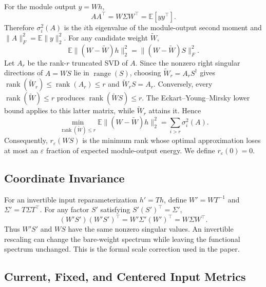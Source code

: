 \documentclass[letterpaper]{article} %
\begin{document}
For the module output $y=Wh$,
\begin{equation}
AA^\top=W\Sigma W^\top=\mathbb E[yy^\top].
\label{eq:supp-output}
\end{equation}
Therefore $\sigma_i^2(A)$ is the $i$th eigenvalue of the module-output second moment and
$\|A\|_F^2=\mathbb E\|y\|_2^2$. For any candidate weight $\widetilde W$,
\begin{equation}
\mathbb E\|(W-\widetilde W)h\|_2^2
=\|(W-\widetilde W)S\|_F^2.
\label{eq:supp-error}
\end{equation}
Let $A_r$ be the rank-$r$ truncated SVD of $A$. Since the nonzero right singular
directions of $A=WS$ lie in $\operatorname{range}(S)$, choosing
$\widetilde W_r=A_rS^\dagger$ gives
$\operatorname{rank}(\widetilde W_r)\leq\operatorname{rank}(A_r)\leq r$ and
$\widetilde W_rS=A_r$. Conversely, every
$\operatorname{rank}(\widetilde W)\leq r$ produces
$\operatorname{rank}(\widetilde WS)\leq r$. The Eckart--Young--Mirsky lower
bound applies to this latter matrix, while $\widetilde W_r$ attains it. Hence
\begin{equation}
\min_{\operatorname{rank}(\widetilde W)\le r}
\mathbb E\|(W-\widetilde W)h\|_2^2
=\sum_{i>r}\sigma_i^2(A).
\label{eq:supp-optimal}
\end{equation}
Consequently, $r_\varepsilon(WS)$ is the minimum rank whose optimal approximation loses
at most an $\varepsilon$ fraction of expected module-output energy. We define
$r_\varepsilon(0)=0$.

\subsection{Coordinate Invariance}

For an invertible input reparameterization $h'=Th$, define
$W'=WT^{-1}$ and $\Sigma'=T\Sigma T^\top$. For any factor $S'$ satisfying
$S'(S')^\top=\Sigma'$,
\begin{equation}
(W'S')(W'S')^\top
=W'\Sigma'(W')^\top
=W\Sigma W^\top.
\end{equation}
Thus $W'S'$ and $WS$ have the same nonzero singular values. An invertible rescaling can
change the bare-weight spectrum while leaving the functional spectrum unchanged. This is
the formal scale correction used in the paper.

\subsection{Current, Fixed, and Centered Input Metrics}
\end{document}
